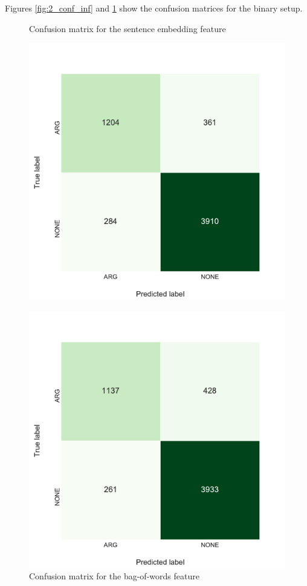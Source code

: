 Figures \ref{fig:2_conf_inf} and \ref{fig:2_conf_uni} show the confusion matrices for the binary setup. 
\begin{figure}[h]
    \begin{minipage}{.5\linewidth}
   \caption{Confusion matrix for the sentence embedding feature} 
    \label{fig:2_conf_inf}
 \centering
	\includegraphics[width=1\textwidth]{images/experiments/conf-InferSent_True}
  \end{minipage} \hfill
    \begin{minipage}{.5\linewidth}
  
     \caption{Confusion matrix for the bag-of-words feature} 
       \label{fig:2_conf_uni}
 \centering
	\includegraphics[width=1\textwidth]{images/experiments/conf-Bag-Of-Words_true}
    \end{minipage} 
\end{figure}
